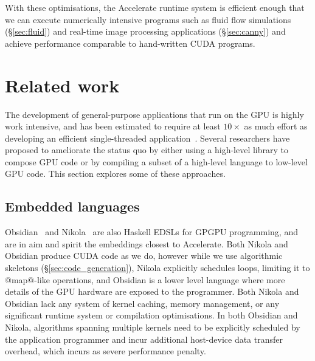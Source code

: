 With these optimisations, the Accelerate runtime system is efficient enough that
we can execute numerically intensive programs such as fluid flow simulations
(\S\ref{sec:fluid}) and real-time image processing applications
(\S\ref{sec:canny}) and achieve performance comparable to hand-written CUDA
programs.


\section{Related work}
\label{sec:implementation_related}

The development of general-purpose applications that run on the GPU is highly
work intensive, and has been estimated to require at least $10\times$ as much
effort as developing an efficient single-threaded
application~\cite{Sweeney:2009ua}. Several researchers have proposed to
ameliorate the status quo by either using a high-level library to compose GPU
code or by compiling a subset of a high-level language to low-level GPU code.
This section explores some of these approaches.


\subsection{Embedded languages}



Obsidian~\cite{Svensson:2008a} and Nikola~\cite{Mainland:2010vj} are also
Haskell EDSLs for GPGPU programming, and are in aim and spirit the embeddings
closest to Accelerate. Both Nikola and Obsidian produce CUDA code as we do,
however while we use algorithmic skeletons (\S\ref{sec:code_generation}), Nikola
explicitly schedules loops, limiting it to @map@-like operations, and Obsidian
is a lower level language where more details of the GPU hardware are exposed to
the programmer. Both Nikola and Obsidian lack any system of kernel caching,
memory management, or any significant runtime system or compilation
optimisations. In both Obsidian and Nikola, algorithms spanning multiple kernels
need to be explicitly scheduled by the application programmer and incur
additional host-device data transfer overhead, which incurs as severe
performance penalty.

